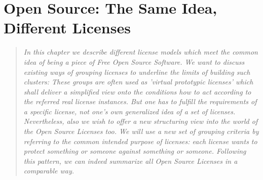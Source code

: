 %
%
%
%
%

\chapter{Open Source: The Same Idea, Different Licenses}\label{sec:LicenseTaxonomies}

\footnotesize \begin{quote}\itshape In this chapter we describe different
license models which meet the common idea of being a piece of Free Open Source
Software. We want to discuss existing ways of grouping licenses to underline the
limits of building such clusters: These groups are often used as 'virtual
prototypic licenses' which shall deliver a simplified view onto the conditions
how to act according to the referred real license instances. But one has to
fulfill the requirements of a specific license, not one's own generalized idea
of a set of licenses. Nevertheless, also we wish to offer a new structuring view
into the world of the Open Source Licenses too. We will use a new set of
grouping criteria by referring to the common intended purpose of licenses:
each license wants to protect something or someone against something or someone.
Following this pattern, we can indeed summarize all Open Source Licenses in a
comparable way.
\end{quote}
\normalsize{}

